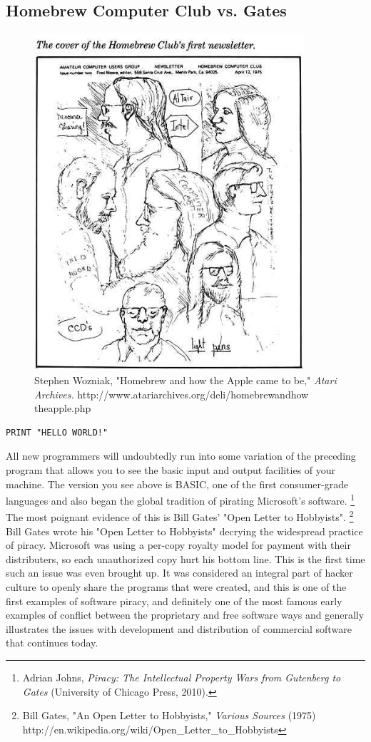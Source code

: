 \documentclass[11pt]{article}
\begin{document}
\subsection{Homebrew Computer Club vs. Gates}
\begin{figure}[ht!]
\center
\includegraphics[width=100mm]{homebrew_cover.jpg}
\caption{Stephen Wozniak, "Homebrew and how the Apple came to be," \emph{Atari Archives.} http://www.atariarchives.org/deli/homebrew\textunderscore and\textunderscore how \textunderscore the\textunderscore apple.php }
\end{figure}

\begin{verbatim}
PRINT "HELLO WORLD!"
\end{verbatim}

All new programmers will undoubtedly run into some variation of the preceding  program that allows you to see the basic input and output facilities of your machine. The version you see above is BASIC, one of the first consumer-grade languages and also began the global tradition of pirating Microsoft's software.
\footnote{Adrian Johns, \emph{Piracy: The Intellectual Property Wars from Gutenberg to Gates} (University of Chicago Press, 2010).}
The most poignant evidence of this is Bill Gates' "Open Letter to Hobbyists".
\footnote{Bill Gates, "An Open Letter to Hobbyists," \emph{Various Sources} (1975) http://en.wikipedia.org/wiki/Open\_Letter\_to\_Hobbyists}
Bill Gates wrote his "Open Letter to Hobbyists" decrying the widespread practice of piracy. Microsoft was using a per-copy royalty model for payment with their distributers, so each unauthorized copy hurt his bottom line. This is the first time such an issue was even brought up. It was considered an integral part of hacker culture to openly share the programs that were created, and this is one of the first examples of software piracy, and definitely one of the most famous early examples of conflict between the proprietary and free software ways and generally illustrates the issues with development and distribution of commercial software that continues today.
\end{document}

